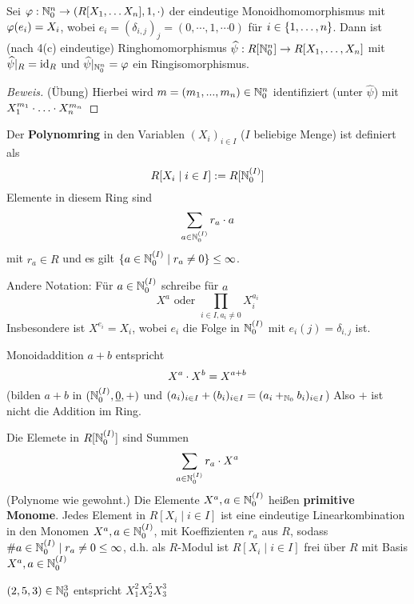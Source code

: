 \documentclass[a4paper]{report}
\begin{document}
\begin{satz}
  Sei $\varphi : \mathbb{N}_0^{n} \to (R[X_{1}, \ldots X_{n}], 1, \cdot)$ der eindeutige Monoidhomomorphismus mit $\varphi(e_{i}) = X_{i}$, wobei $e_{i} = (\delta_{i,j})_{j} = (0, \cdots, 1, \cdots 0)$ für $i \in \{1, \ldots, n\}$. Dann ist (nach 4(c) eindeutige) Ringhomomorphismus $\widehat \psi : R[\mathbb{N}_0^{n}] \to R[X_{1}, \ldots, X_{n}]$ mit $\widehat \psi|_{R} = \operatorname{id}_{R}$ und $\widehat \psi|_{\mathbb{N}_0^{n}} = \varphi$ ein Ringisomorphismus.
  \begin{proof}[Beweis]
    (Übung) Hierbei wird $m = (m_{1}, ..., m_{n}) \in \mathbb{N}_0^{n}$ identifiziert (unter $\hat \psi$) mit $X_{1}^{m_{1}}\cdot \ldots \cdot X_{n}^{m_{n}}$
  \end{proof}
\end{satz}

\begin{defi}
  Der \textbf{Polynomring} in den Variablen $(X_{i})_{i \in I}$ ($I$ beliebige Menge) ist definiert als
  \[R[X_{i} \mid i \in I] := R[\mathbb{N}_0^{(I)}]\]
  Elemente in diesem Ring sind
  \[\sum_{a \in \mathbb{N}_0^{(I)}}r_{a}\cdot a\]
  mit $r_{a} \in R$ und es gilt $\{a \in \mathbb{N}_0^{(I)} \mid r_{a} \ne 0\} \le \infty$.
\end{defi}
\begin{nota*}
  Andere Notation: Für $a \in \mathbb{N}_0^{(I)}$ schreibe für $a$ \[X^{a} \text{ oder } \prod_{i \in I, a_{i} \ne 0} X_{i}^{a_{i}}\]
  Insbesondere ist \(X^{e_{i}} = X_{i}\), wobei $e_{i}$ die Folge in $\mathbb{N}_0^{(I)}$ mit $e_{i}(j) = \delta_{i,j}$ ist.
  \item Monoidaddition $a + b$ entspricht \[X^{a} \cdot X^{b} = X^{a + b}\]
  (bilden $a + b$ in $(\mathbb{N}_0^{(I)}, \underline 0, +)$ und $(a_{i})_{i \in I} + (b_{i})_{i \in I} = (a_{i} +_{\mathbb{N}_0} b_{i})_{i \in I}$) Also $+$ ist nicht die Addition im Ring.
\end{nota*}
\begin{defi*}
Die Elemete in $R[\mathbb{N}_0^{(I)}]$ sind Summen \[\sum_{a \in \mathbb{N}_0^{(I)}}r_{a} \cdot X^{a}\] (Polynome wie gewohnt.) Die Elemente $X^{a}, a \in \mathbb{N}_0^{(I)}$ heißen \textbf{primitive Monome}. Jedes Element in $R[X_{i} \mid i \in I]$ ist eine eindeutige Linearkombination in den Monomen $X^{a}, a \in \mathbb{N}_0^{(I)}$, mit Koeffizienten $r_{a}$ aus $R$, sodass $\#{a \in \mathbb{N}_0^{(I)} \mid r_{a} \ne 0} \le \infty$, d.h. als $R$-Modul ist $R[X_{i} \mid i \in I]$ frei über $R$ mit Basis $X^{a}, a \in \mathbb{N}_0^{(I)}$
\end{defi*}
\begin{bsp*}
$(2, 5, 3) \in \mathbb{N}_0^{3}$ entspricht $X_{1}^{2}X_{2}^{5}X_{3}^{3}$
\end{bsp*}
\end{document}
